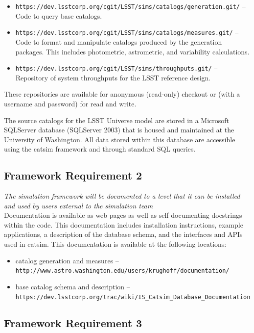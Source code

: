 \documentclass[]{article}
\begin{document}
\begin{itemize}
\item {\tt https://dev.lsstcorp.org/cgit/LSST/sims/catalogs/generation.git/} -- Code to query
base catalogs.
\item {\tt https://dev.lsstcorp.org/cgit/LSST/sims/catalogs/measures.git/} -- Code to format
and manipulate catalogs produced by the generation packages.  This includes photometric, 
astrometric, and variability calculations.
\item {\tt https://dev.lsstcorp.org/cgit/LSST/sims/throughputs.git/} -- Repository
of system throughputs for the LSST reference design.
\end{itemize}

These repositories are available for anonymous (read-only) checkout or
(with a username and password) for read and write.

The source catalogs for the LSST Universe model are stored in a
Microsoft SQLServer database (SQLServer 2003) that is housed and
maintained at the University of Washington. All data stored within
this database are accessible using the catsim framework and through
standard SQL queries.

\subsection{Framework Requirement 2}

{\it The simulation framework will be documented to a level
  that it can be installed and used by users external to the
  simulation team}\\

Documentation is available as web pages as well as self documenting
docstrings within the code.  This documentation includes installation
instructions, example applications, a description of the database
schema, and the interfaces and APIs used in catsim. This documentation
is available at the following locations:
\begin{itemize}
\item catalog generation and measures -- {\tt http://www.astro.washington.edu/users/krughoff/documentation/}
\item base catalog schema and description -- {\tt https://dev.lsstcorp.org/trac/wiki/IS\_Catsim\_Database\_Documentation}
\end{itemize}


\subsection{Framework Requirement 3}
\end{document}

